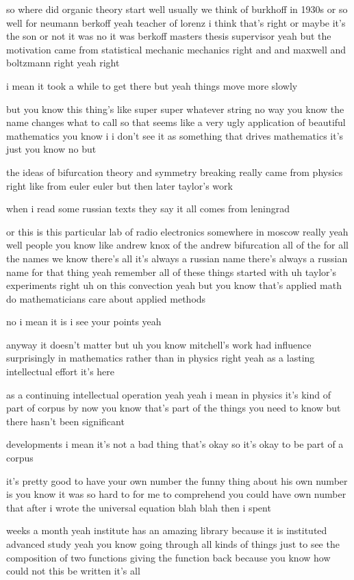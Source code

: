 \begin{description}
so where did organic theory start well usually we think of burkhoff in 1930s or so well for neumann berkoff yeah teacher of lorenz i think that's right or maybe it's the son or not it was no it was berkoff masters thesis supervisor yeah but the motivation came from statistical mechanic mechanics right and and maxwell and boltzmann right yeah right

i mean it took a while to get there but yeah things move more slowly

but you know this thing's like super super whatever string no way you know the name changes what to call so that seems like a very ugly application of beautiful mathematics you know i i don't see it as something that drives mathematics it's just you know no but

the ideas of bifurcation theory and symmetry breaking really came from physics right like from euler euler but then later taylor's work

when i read some russian texts they say it all comes from leningrad

or this is this particular lab of radio electronics somewhere in moscow really yeah well people you know like andrew knox of the andrew bifurcation all of the for all the names we know there's all it's always a russian name there's always a russian name for that thing yeah remember all of these things started with uh taylor's experiments right uh on this convection yeah but you know that's applied math do mathematicians care about applied methods

no i mean it is i see your points yeah

anyway it doesn't matter but uh you know mitchell's work had influence surprisingly in mathematics rather than in physics right yeah as a lasting intellectual effort it's here

as a continuing intellectual operation yeah yeah i mean in physics it's kind of part of corpus by now you know that's part of the things you need to know but there hasn't been significant

developments i mean it's not a bad thing that's okay so it's okay to be part of a corpus

it's pretty good to have your own number the funny thing about his own number is you know it was so hard to for me to comprehend you could have own number that after i wrote the universal equation blah blah then i spent

weeks a month yeah institute has an amazing library because it is instituted advanced study yeah you know going through all kinds of things just to see the composition of two functions giving the function back because you know how could not this be written it's all


\end{description}
